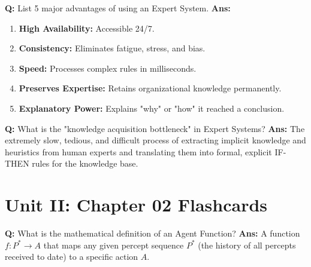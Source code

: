 \documentclass[10pt,a4paper,twocolumn]{article}
\begin{document}
\begin{tcolorbox}[
  colback=white,
  colframe=UnitColorOne,
  colbacktitle=gray!10!white,
  coltitle=black,
  fonttitle=\bfseries\sffamily\small,
  title={Unit I $\bullet$ Card 7: Expert System Advantages},
  boxrule=1.2pt,
  arc=2mm,
  outer arc=2mm,
  boxsep=1.5mm,
  top=1mm,
  bottom=1mm,
  left=1.5mm,
  right=1.5mm,
  before skip=2.5mm,
  after skip=2.5mm
]
\textbf{Q:} List 5 major advantages of using an Expert System.
\tcbline
\textbf{Ans:} \begin{enumerate}
  \item \textbf{High Availability:} Accessible 24/7.
  \item \textbf{Consistency:} Eliminates fatigue, stress, and bias.
  \item \textbf{Speed:} Processes complex rules in milliseconds.
  \item \textbf{Preserves Expertise:} Retains organizational knowledge permanently.
  \item \textbf{Explanatory Power:} Explains "why" or "how" it reached a conclusion.
\end{enumerate}
\end{tcolorbox}


\begin{tcolorbox}[
  colback=white,
  colframe=UnitColorOne,
  colbacktitle=gray!10!white,
  coltitle=black,
  fonttitle=\bfseries\sffamily\small,
  title={Unit I $\bullet$ Card 8: Knowledge Acquisition Bottleneck},
  boxrule=1.2pt,
  arc=2mm,
  outer arc=2mm,
  boxsep=1.5mm,
  top=1mm,
  bottom=1mm,
  left=1.5mm,
  right=1.5mm,
  before skip=2.5mm,
  after skip=2.5mm
]
\textbf{Q:} What is the "knowledge acquisition bottleneck" in Expert Systems?
\tcbline
\textbf{Ans:} The extremely slow, tedious, and difficult process of extracting implicit knowledge and heuristics from human experts and translating them into formal, explicit IF-THEN rules for the knowledge base.
\end{tcolorbox}

\section*{Unit II: Chapter 02 Flashcards}

\begin{tcolorbox}[
  colback=white,
  colframe=UnitColorTwo,
  colbacktitle=gray!10!white,
  coltitle=black,
  fonttitle=\bfseries\sffamily\small,
  title={Unit II $\bullet$ Card 1: Definition of Agent Function},
  boxrule=1.2pt,
  arc=2mm,
  outer arc=2mm,
  boxsep=1.5mm,
  top=1mm,
  bottom=1mm,
  left=1.5mm,
  right=1.5mm,
  before skip=2.5mm,
  after skip=2.5mm
]
\textbf{Q:} What is the mathematical definition of an Agent Function?
\tcbline
\textbf{Ans:} A function $f: P^* \rightarrow A$ that maps any given percept sequence $P^*$ (the history of all percepts received to date) to a specific action $A$.
\end{tcolorbox}
\end{document}
